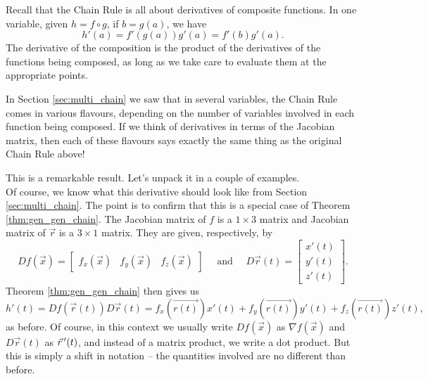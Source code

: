 Recall that the Chain Rule is all about derivatives of composite functions. In one variable, given $h=f\circ g$, if $b=g(a)$, we have
\[
h'(a) = f'(g(a))g'(a) = f'(b)g'(a).
\]
The derivative of the composition is the product of the derivatives of the functions being composed, as long as we take care to evaluate them at the appropriate points.

In Section \ref{sec:multi_chain} we saw that in several variables, the Chain Rule comes in various flavours, depending on the number of variables involved in each function being composed. If we think of derivatives in terms of the Jacobian matrix, then each of these flavours says exactly the same thing as the original Chain Rule above!


This is a remarkable result. Let's unpack it in a couple of examples.\\

{
Of course, we know what this derivative should look like from Section \ref{sec:multi_chain}. The point is to confirm that this is a special case of Theorem \ref{thm:gen_gen_chain}. The Jacobian matrix of $f$ is a $1\times 3$ matrix and Jacobian matrix of $\vec{r}$ is a $3\times 1$ matrix. They are given, respectively, by
\[
Df(\vec{x}) = \begin{bmatrix}
f_x(\vec{x}) & f_y(\vec{x}) & f_z(\vec{x})
\end{bmatrix} \quad \text{ and } \quad D\vec{r}(t) = \begin{bmatrix}x'(t)\\y'(t)\\z'(t)\end{bmatrix}.
\]
Theorem \ref{thm:gen_gen_chain} then gives us
\[
h'(t) = Df(\vec{r}(t))D\vec{r}(t) = f_x(\vec{r(t)})x'(t)+f_y(\vec{r(t)})y'(t)+f_z(\vec{r(t)})z'(t),
\]
as before. Of course, in this context we usually write $Df(\vec{x})$ as $\nabla f(\vec{x})$ and $D\vec{r}(t)$ as $\vec r\, '(t)$, and instead of a matrix product, we write a dot product. But this is simply a shift in notation -- the quantities involved are no different than before.
}\\

